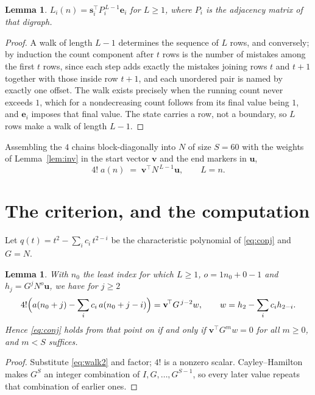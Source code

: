 \documentclass[11pt,a4paper]{article}
\theoremstyle{plain}
\newtheorem{lemma}[theorem]{Lemma}
\theoremstyle{definition}
\begin{document}
\begin{lemma}\label{lem:walk}
$L_i(n)=\mathbf{s}_i^{\!\top}P_i^{\,L-1}\mathbf{e}_i$ for $L\ge1$, where $P_i$ is the
adjacency matrix of that digraph.
\end{lemma}

\begin{proof}
A walk of length $L-1$ determines the sequence of $L$ rows, and conversely; by induction
the count component after $t$ rows is the number of mistakes among the first $t$ rows,
since each step adds exactly the mistakes joining rows $t$ and $t+1$ together with those
inside row $t+1$, and each unordered pair is named by exactly one offset. The walk exists
precisely when the running count never exceeds $1$, which for a nondecreasing count follows
from its final value being $1$, and $\mathbf{e}_i$ imposes that final value. The state
carries a row, not a boundary, so $L$ rows make a walk of length $L-1$.
\end{proof}

Assembling the $4$ chains block-diagonally into $N$ of size $S=60$ with the weights of
Lemma~\ref{lem:inv} in the start vector $\mathbf{v}$ and the end markers in
$\mathbf{u}$,
\begin{equation}\label{eq:walk2}
4!\;a(n)\;=\;\mathbf{v}^{\!\top}N^{\,L-1}\mathbf{u},\qquad L=n .
\end{equation}

\section{The criterion, and the computation}

Let $q(t)=t^{2}-\sum_i c_i\,t^{2-i}$ be the characteristic polynomial of
\eqref{eq:conj} and $G=N$.

\begin{lemma}\label{lem:crit}
With $n_0$ the least index for which $L\ge1$, $o=1n_0+0-1$ and
$h_j=G^{j}N^{o}\mathbf{u}$, we have for $j\ge2$
\[
4!\Bigl(a(n_0+j)-\sum_i c_i\,a(n_0+j-i)\Bigr)=\mathbf{v}^{\!\top}G^{\,j-2}w,
\qquad w=h_{2}-\sum_i c_ih_{2-i} .
\]
Hence \eqref{eq:conj} holds from that point on if and only if
$\mathbf{v}^{\!\top}G^{m}w=0$ for all $m\ge0$, and $m<S$ suffices.
\end{lemma}

\begin{proof}
Substitute \eqref{eq:walk2} and factor; $4!$ is a nonzero scalar. Cayley--Hamilton
makes $G^{S}$ an integer combination of $I,G,\dots,G^{S-1}$, so every later value repeats
that combination of earlier ones.
\end{proof}
\end{document}
